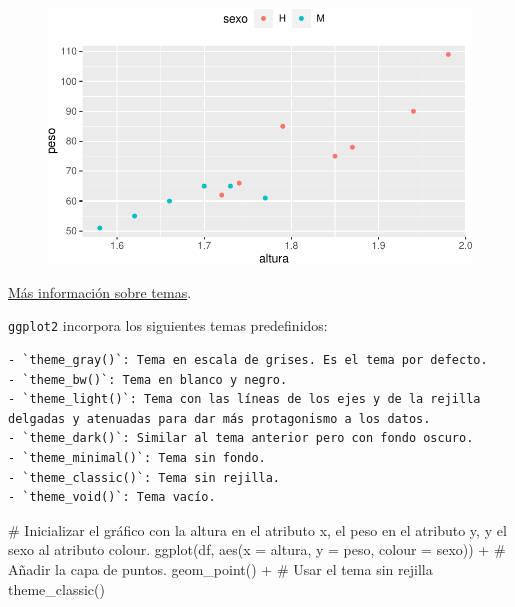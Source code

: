 \documentclass[
  a4paper,
]{scrreport}
\newenvironment{Shaded}{\begin{snugshade}}{\end{snugshade}}
\newcommand{\AttributeTok}[1]{\textcolor[rgb]{0.40,0.45,0.13}{#1}}
\newcommand{\CommentTok}[1]{\textcolor[rgb]{0.37,0.37,0.37}{#1}}
\newcommand{\FunctionTok}[1]{\textcolor[rgb]{0.28,0.35,0.67}{#1}}
\newcommand{\NormalTok}[1]{\textcolor[rgb]{0.00,0.23,0.31}{#1}}
\newcommand{\SpecialCharTok}[1]{\textcolor[rgb]{0.37,0.37,0.37}{#1}}
\theoremstyle{definition}
\theoremstyle{definition}
\theoremstyle{remark}
\begin{document}
\begin{figure}[H]

{\centering \includegraphics{./07-graficos_files/figure-pdf/unnamed-chunk-31-1.pdf}

}

\end{figure}

\href{https://ggplot2.tidyverse.org/reference/theme.html}{Más
información sobre temas}.

\texttt{ggplot2} incorpora los siguientes temas predefinidos:

\begin{verbatim}
- `theme_gray()`: Tema en escala de grises. Es el tema por defecto.
- `theme_bw()`: Tema en blanco y negro.
- `theme_light()`: Tema con las líneas de los ejes y de la rejilla delgadas y atenuadas para dar más protagonismo a los datos.
- `theme_dark()`: Similar al tema anterior pero con fondo oscuro.
- `theme_minimal()`: Tema sin fondo.
- `theme_classic()`: Tema sin rejilla.
- `theme_void()`: Tema vacío.
\end{verbatim}

\begin{Shaded}
\begin{Highlighting}[]
\CommentTok{\# Inicializar el gráfico con la altura en el atributo x, el peso en el atributo y, y el sexo al atributo colour.}
\FunctionTok{ggplot}\NormalTok{(df, }\FunctionTok{aes}\NormalTok{(}\AttributeTok{x =}\NormalTok{ altura, }\AttributeTok{y =}\NormalTok{ peso, }\AttributeTok{colour =}\NormalTok{ sexo)) }\SpecialCharTok{+}
\CommentTok{\# Añadir la capa de puntos.}
    \FunctionTok{geom\_point}\NormalTok{() }\SpecialCharTok{+}
\CommentTok{\# Usar el tema sin rejilla}
    \FunctionTok{theme\_classic}\NormalTok{()}
\end{Highlighting}
\end{Shaded}
\end{document}
